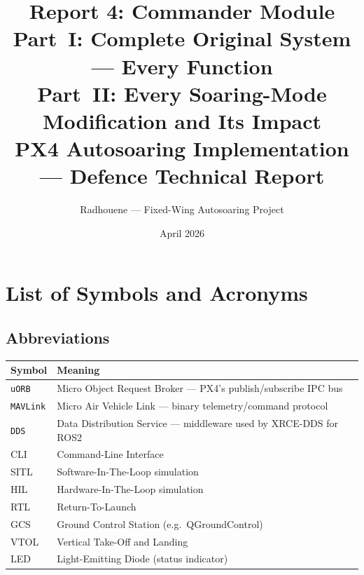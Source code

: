 \documentclass[12pt,a4paper]{article}
\title{\textbf{Report 4: Commander Module}\\[0.4em]
\large \textbf{Part~I:} Complete Original System --- Every Function\\
\textbf{Part~II:} Every Soaring-Mode Modification and Its Impact\\[0.5em]
\normalsize PX4 Autosoaring Implementation --- Defence Technical Report}
\author{Radhouene --- Fixed-Wing Autosoaring Project}
\date{April 2026}
\begin{document}
\maketitle
\tableofcontents
\newpage

\section*{List of Symbols and Acronyms}

\subsection*{Abbreviations}
\begin{center}\begin{tabular}{ll}\toprule
Symbol & Meaning \\\midrule
\texttt{uORB} & Micro Object Request Broker --- PX4's publish/subscribe IPC bus \\
\texttt{MAVLink} & Micro Air Vehicle Link --- binary telemetry/command protocol \\
\texttt{DDS} & Data Distribution Service --- middleware used by XRCE-DDS for ROS2 \\
CLI & Command-Line Interface \\
SITL & Software-In-The-Loop simulation \\
HIL & Hardware-In-The-Loop simulation \\
RTL & Return-To-Launch \\
GCS & Ground Control Station (e.g.\ QGroundControl) \\
VTOL & Vertical Take-Off and Landing \\
LED & Light-Emitting Diode (status indicator) \\
\bottomrule\end{tabular}\end{center}
\end{document}
